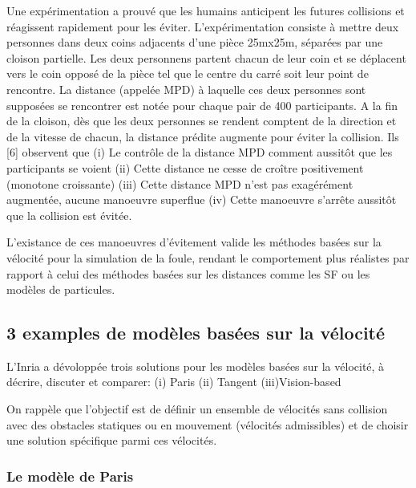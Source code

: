 \documentclass[11pt]{report}
\begin{document}
Une expérimentation a prouvé que les humains anticipent les futures collisions et réagissent rapidement pour les éviter. L'expérimentation consiste à mettre deux personnes dans deux coins adjacents d'une pièce 25mx25m, séparées par une cloison partielle. Les deux personnens partent chacun de leur coin et se déplacent vers le coin opposé de la pièce tel que le centre du carré soit leur point de rencontre. La distance (appelée MPD) à laquelle ces deux personnes sont supposées se rencontrer est notée pour chaque pair de 400 participants. A la fin de la cloison, dès que les deux personnes se rendent comptent de la direction et de la vitesse de chacun, la distance prédite augmente pour éviter la collision. Ils [6] observent que 
(i) Le contrôle de la distance MPD comment aussitôt que les participants se voient
(ii) Cette distance ne cesse de croître positivement (monotone croissante)
(iii) Cette distance MPD n'est pas exagérément augmentée, aucune manoeuvre superflue 
(iv) Cette manoeuvre s'arrête aussitôt que la collision est évitée.

L'existance de ces manoeuvres d'évitement valide les méthodes basées sur la vélocité pour la simulation de la foule, rendant le comportement plus réalistes par rapport à celui des méthodes basées sur les distances comme les SF ou les modèles de particules.

\subsection{3 examples de modèles basées sur la vélocité}

L'Inria a dévoloppée trois solutions pour les modèles basées sur la vélocité, à décrire, discuter et comparer:
(i) Paris
(ii) Tangent
(iii)Vision-based

On rappèle que l'objectif est de définir un ensemble de vélocités sans collision avec des obstacles statiques ou en mouvement (vélocités admissibles) et de choisir une solution spécifique parmi ces vélocités.

\subsubsection{Le modèle de Paris}
\end{document}
